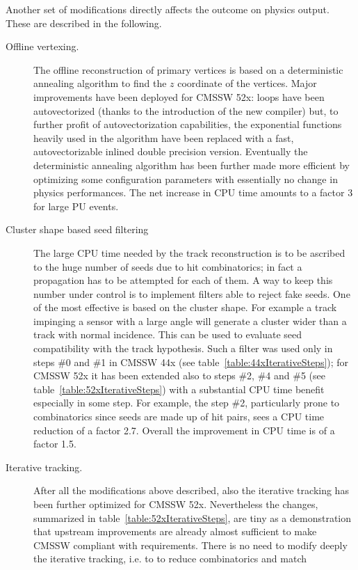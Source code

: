Another set of modifications directly affects the outcome on physics
output. These are described in the following.
\begin{description}
\item[Offline vertexing.] The offline reconstruction of primary
  vertices is based on a deterministic annealing algorithm to find the
  $z$ coordinate of the vertices. Major improvements have been
  deployed for CMSSW 52x: loops have been autovectorized (thanks to
  the introduction of the new compiler) but, to further profit of
  autovectorization capabilities, the exponential functions heavily
  used in the algorithm have been replaced with a fast,
  autovectorizable inlined double precision version. Eventually the
  deterministic annealing algorithm has been further made more
  efficient by optimizing some configuration parameters
  with essentially no change in physics performances. The net increase
  in CPU time amounts to a factor 3 for large PU events.
\item[Cluster shape based seed filtering] The large CPU time needed by
  the track reconstruction is to be ascribed to the huge number of
  seeds due to hit combinatorics; in fact a propagation has to be attempted for
  each of them. A way to keep this number under control is to
  implement filters able to reject fake seeds. One of the most
  effective is based on the cluster shape. For example a track
  impinging a sensor with a large angle will generate a cluster
  wider than a track with normal incidence. This can be used to
  evaluate seed compatibility with the track hypothesis. Such a filter
  was used only in steps \#0 and \#1 in CMSSW 44x (see
  table~\ref{table:44xIterativeSteps}); for CMSSW 52x it has been
  extended also to steps \#2, \#4 and \#5 (see
  table~\ref{table:52xIterativeSteps}) with a substantial CPU time
  benefit especially in some step. For example, the step \#2, 
  particularly prone to combinatorics since seeds are made up of hit
  pairs, sees a CPU time reduction of a factor 2.7. Overall the
  improvement in CPU time is of a factor 1.5. 
\item[Iterative tracking.] After all the modifications above
  described, also the iterative tracking has been further optimized
  for CMSSW 52x. Nevertheless the changes, summarized in
  table~\ref{table:52xIterativeSteps}, are tiny as a demonstration
  that upstream improvements are already almost sufficient to make
  CMSSW compliant with requirements. There is no need to modify deeply
  the iterative tracking, i.e. to to reduce combinatorics and match

\end{description}
